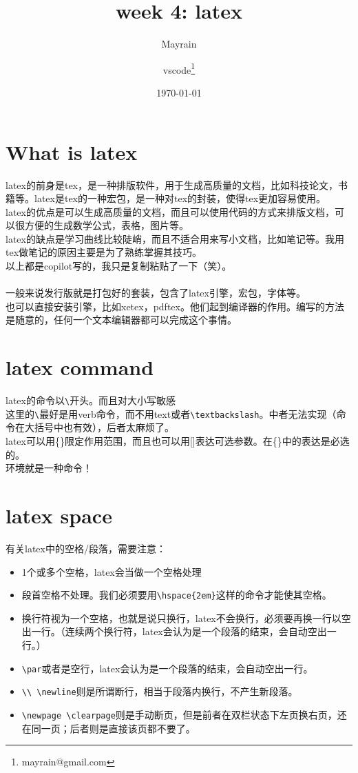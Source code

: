 \documentclass{article}
\title{week 4: latex}
\author{Mayrain\and vscode\thanks{mayrain@gmail.com}}
\date{\today}
\begin{document}
\maketitle
\section{What is latex}
\noindent
latex的前身是tex，是一种排版软件，用于生成高质量的文档，比如科技论文，书籍等。latex是tex的一种宏包，是一种对tex的封装，使得tex更加容易使用。\\
latex的优点是可以生成高质量的文档，而且可以使用代码的方式来排版文档，可以很方便的生成数学公式，表格，图片等。\\
latex的缺点是学习曲线比较陡峭，而且不适合用来写小文档，比如笔记等。我用tex做笔记的原因主要是为了熟练掌握其技巧。\\
以上都是copilot写的，我只是复制粘贴了一下（笑）。\\
\\
一般来说发行版就是打包好的套装，包含了latex引擎，宏包，字体等。\\
也可以直接安装引擎，比如xetex，pdftex。他们起到编译器的作用。编写的方法是随意的，任何一个文本编辑器都可以完成这个事情。\\
\section{latex command}
\noindent
latex的命令以\verb|\|开头。而且对大小写敏感\\
这里的\verb|\|最好是用verb命令，而不用text或者\verb|\textbackslash|。中者无法实现（命令在大括号中也有效），后者太麻烦了。\\
latex可以用\{\}限定作用范围，而且也可以用[]表达可选参数。在\{\}中的表达是必选的。\\
环境就是一种命令！\\
\section{latex space}
\noindent
有关latex中的空格/段落，需要注意：\\
\begin{itemize}
    \item 1个或多个空格，latex会当做一个空格处理
    \item 段首空格不处理。我们必须要用\verb|\hspace{2em}|这样的命令才能使其空格。
    \item 换行符视为一个空格，也就是说只换行，latex不会换行，必须要再换一行以空出一行。（连续两个换行符，latex会认为是一个段落的结束，会自动空出一行。）
    \item \verb|\par|或者是空行，latex会认为是一个段落的结束，会自动空出一行。
    \item \verb|\\ \newline|则是所谓断行，相当于段落内换行，不产生新段落。
    \item \verb|\newpage \clearpage|则是手动断页，但是前者在双栏状态下左页换右页，还在同一页；后者则是直接该页都不要了。
\end{itemize}
\end{document}
